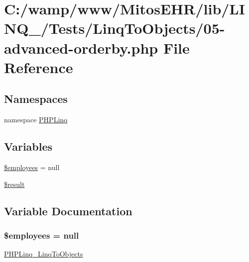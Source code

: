 \hypertarget{_linq_to_objects_205-advanced-orderby_8php}{\section{\-C\-:/wamp/www/\-Mitos\-E\-H\-R/lib/\-L\-I\-N\-Q\-\_/\-Tests/\-Linq\-To\-Objects/05-\/advanced-\/orderby.php \-File \-Reference}
\label{_linq_to_objects_205-advanced-orderby_8php}
}
\subsection*{\-Namespaces}
\begin{DoxyCompactItemize}
\item 
namespace \hyperlink{namespace_p_h_p_linq}{\-P\-H\-P\-Linq}
\end{DoxyCompactItemize}
\subsection*{\-Variables}
\begin{DoxyCompactItemize}
\item 
\hyperlink{_linq_to_objects_205-advanced-orderby_8php_a598c06abe9d65a9d2990e39693ce2c27}{\$employees} = null
\item 
\hyperlink{_linq_to_objects_205-advanced-orderby_8php_a112ef069ddc0454086e3d1e6d8d55d07}{\$result}
\end{DoxyCompactItemize}


\subsection{\-Variable \-Documentation}
\hypertarget{_linq_to_objects_205-advanced-orderby_8php_a598c06abe9d65a9d2990e39693ce2c27}{
\subsubsection[{\$employees}]{\setlength{\rightskip}{0pt plus 5cm}\$employees = null}}\label{_linq_to_objects_205-advanced-orderby_8php_a598c06abe9d65a9d2990e39693ce2c27}
\hyperlink{class_p_h_p_linq___linq_to_objects}{\-P\-H\-P\-Linq\-\_\-\-Linq\-To\-Objects} 

